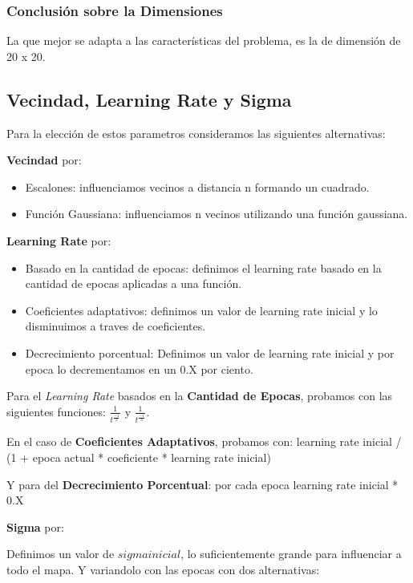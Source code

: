 \subsubsection{Conclusión sobre la Dimensiones}


La que mejor se adapta a las características del problema, es la
de dimensión de 20 x 20.


\subsection{Vecindad, Learning Rate y Sigma}

Para la elección de estos parametros consideramos las siguientes
alternativas:

\textbf{Vecindad} por:

\begin{itemize}
	\item Escalones: influenciamos vecinos a distancia n formando
un cuadrado.
	\item Función Gaussiana: influenciamos n vecinos utilizando
una función gaussiana.
\end{itemize}


\textbf{Learning Rate} por:

\begin{itemize}
	\item Basado en la cantidad de epocas: definimos el learning
rate basado en la cantidad de epocas aplicadas a una función.
	\item Coeficientes adaptativos: definimos un valor de
learning rate inicial y lo disminuimos a traves de coeficientes.
	\item Decrecimiento porcentual: Definimos un valor de 
learning rate inicial y por epoca lo decrementamos en un 0.X por ciento.
\end{itemize}

Para el \emph{Learning Rate} basados en la \textbf{Cantidad de Epocas}, probamos con 
las siguientes funciones: $\frac{1}{t^\frac{-1}{2}}$ y $\frac{1}{t^\frac{-1}{3}}$.


En el caso de \textbf{Coeficientes Adaptativos}, probamos con:
learning rate inicial / (1 + epoca actual * coeficiente * learning rate inicial)

Y para del \textbf{Decrecimiento Porcentual}: por cada epoca learning rate inicial * 0.X


\textbf{Sigma} por:

Definimos un valor de $sigma inicial$, lo suficientemente grande para influenciar a todo 
el mapa. Y variandolo con las epocas con dos alternativas:

